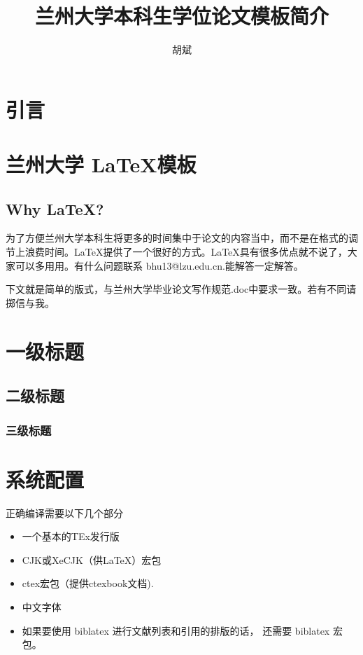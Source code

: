 \documentclass{LZUthesis}
\begin{document}
%
%

\title{{兰州大学本科生学位论文模板简介}}
\author{胡斌}



\maketitle

\makestatement



\frontmatter
\tableofcontents
\mainmatter
\chapter*{引言}
\chapter{兰州大学 \LaTeX 模板}

\section{Why \LaTeX ? }
为了方便兰州大学本科生将更多的时间集中于论文的内容当中，而不是在格式的调节上浪费时间。\LaTeX{}提供了一个很好的方式。\LaTeX{}具有很多优点就不说了，大家可以多用用。有什么问题联系 bhu13@lzu.edu.cn.能解答一定解答。
\par 下文就是简单的版式，与兰州大学毕业论文写作规范.doc中要求一致。若有不同请掷信与我。

\chapter{一级标题}
\section{二级标题}
\subsection{三级标题}
\chapter{系统配置}
正确编译需要以下几个部分
\begin{itemize}
\item 一个基本的TEx发行版
\item CJK或XeCJK（供\LaTeX ）宏包
\item ctex宏包（提供ctexbook文档).
\item 中文字体
\item 如果要使用 biblatex 进行文献列表和引用的排版的话， 还需要 biblatex 宏包。
\end{itemize}
\end{document}
